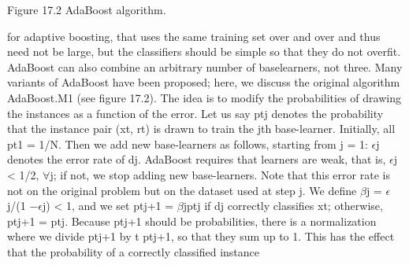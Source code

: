 Figure 17.2 AdaBoost algorithm.

for adaptive boosting, that uses the same training set over and over and thus need not be large, but the classifiers should be simple so that they do not overfit. AdaBoost can also combine an arbitrary number of baselearners, not three. Many variants of AdaBoost have been proposed; here, we discuss the original algorithm AdaBoost.M1 (see figure 17.2). The idea is to modify the probabilities of drawing the instances as a function of the error. Let us say ptj denotes the probability that the instance pair (xt, rt) is drawn to train the jth base-learner. Initially, all pt1 = 1/N. Then we add new base-learners as follows, starting from j = 1: $\epsilon$j denotes the error rate of dj. AdaBoost requires that learners are weak, that is, $\epsilon$j < 1/2, $\forall$j; if not, we stop adding new base-learners. Note that this error rate is not on the original problem but on the dataset used at step j. We define $\beta$j = $\epsilon$j/(1 $-$$\epsilon$j) < 1, and we set ptj+1 = $\beta$jptj if dj correctly classifies xt; otherwise, ptj+1 = ptj. Because ptj+1 should be probabilities, there is a normalization where we divide ptj+1 by t ptj+1, so that they sum up to 1. This has the effect that the probability of a correctly classified instance

